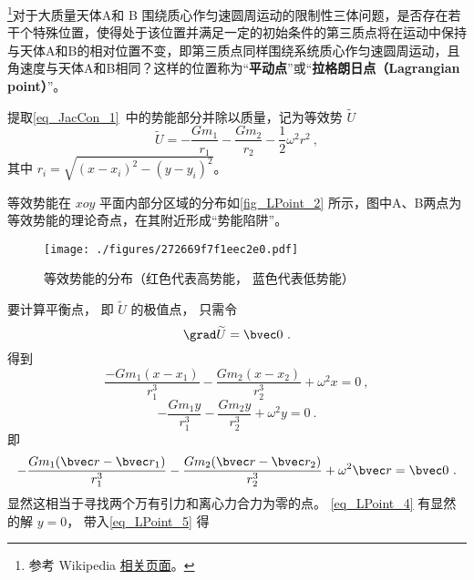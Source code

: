 
\begin{issues}
\issueTODO
\end{issues}


\footnote{参考 Wikipedia \href{https://en.wikipedia.org/wiki/Lagrange_point}{相关页面}。}对于大质量天体A和 B 围绕质心作匀速圆周运动的限制性三体问题，是否存在若干个特殊位置，使得处于该位置并满足一定的初始条件的第三质点将在运动中保持与天体A和B的相对位置不变，即第三质点同样围绕系统质心作匀速圆周运动，且角速度与天体A和B相同？这样的位置称为“\textbf{平动点}”或“\textbf{拉格朗日点（Lagrangian point）}”。

提取\autoref{eq_JacCon_1}~中的势能部分并除以质量，记为等效势 $\widetilde{U}$ 
\begin{equation}
\widetilde{U} = -\frac{Gm_1}{r_1} -\frac{Gm_2}{r_2} -\frac{1}{2}\omega^2 r^2~,
\end{equation}
其中 $r_i = \sqrt{(x - x_i)^2 - (y - y_i)^2}$。

等效势能在 $xoy$ 平面内部分区域的分布如\autoref{fig_LPoint_2} 所示，图中A、B两点为等效势能的理论奇点，在其附近形成“势能陷阱”。 
\begin{figure}[ht]
\centering
\texttt{[image: ./figures/272669f7f1eec2e0.pdf]}
\caption{等效势能的分布（红色代表高势能， 蓝色代表低势能）} \label{fig_LPoint_2}
\end{figure}

要计算平衡点， 即 $\widetilde{U}$ 的极值点， 只需令
\begin{equation}
\grad \widetilde{U} = \bvec 0~.
\end{equation}
得到
\begin{equation}\label{eq_LPoint_5}
\frac{-Gm_1(x-x_1)}{r_1^3} - \frac{Gm_2(x-x_2)}{r_2^3} + \omega^2 x = 0~,
\end{equation}
\begin{equation}\label{eq_LPoint_4}
-\frac{Gm_1 y}{r_1^3} - \frac{Gm_2 y}{r_2^3} + \omega^2 y = 0~.
\end{equation}
即
\begin{equation}
-\frac{Gm_1(\bvec r - \bvec r_1)}{r_1^3} - \frac{Gm_2(\bvec r - \bvec r_2)}{r_2^3} + \omega^2 \bvec r = \bvec 0~.
\end{equation}
显然这相当于寻找两个万有引力和离心力合力为零的点。 \autoref{eq_LPoint_4} 有显然的解 $y = 0$， 带入\autoref{eq_LPoint_5} 得



